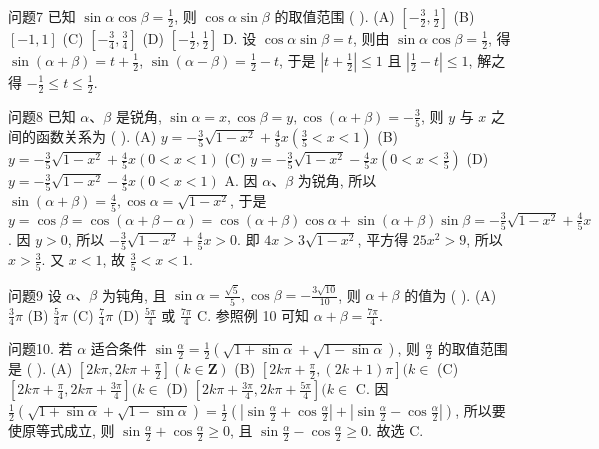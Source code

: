 问题7 已知 $\sin \alpha \cos \beta=\frac{1}{2}$, 则 $\cos \alpha \sin \beta$ 的取值范围 ( ).
(A) $\left[-\frac{3}{2}, \frac{1}{2}\right]$
(B) $[-1,1]$
(C) $\left[-\frac{3}{4}, \frac{3}{4}\right]$
(D) $\left[-\frac{1}{2}, \frac{1}{2}\right]$
D. 设 $\cos \alpha \sin \beta=t$, 则由 $\sin \alpha \cos \beta=\frac{1}{2}$, 得 $\sin (\alpha+\beta)=t+\frac{1}{2}$, $\sin (\alpha-\beta)=\frac{1}{2}-t$, 于是 $\left|t+\frac{1}{2}\right| \leqslant 1$ 且 $\left|\frac{1}{2}-t\right| \leqslant 1$, 解之得 $-\frac{1}{2} \leqslant t \leqslant \frac{1}{2}$.



问题8 已知 $\alpha 、 \beta$ 是锐角, $\sin \alpha=x, \cos \beta=y, \cos (\alpha+\beta)=-\frac{3}{5}$, 则 $y$ 与 $x$ 之间的函数关系为 ( ).
(A) $y=-\frac{3}{5} \sqrt{1-x^2}+\frac{4}{5} x\left(\frac{3}{5}<x<1\right)$
(B) $y=-\frac{3}{5} \sqrt{1-x^2}+\frac{4}{5} x(0<x<1)$
(C) $y=-\frac{3}{5} \sqrt{1-x^2}-\frac{4}{5} x\left(0<x<\frac{3}{5}\right)$
(D) $y=-\frac{3}{5} \sqrt{1-x^2}-\frac{4}{5} x(0<x<1)$
A. 因 $\alpha 、 \beta$ 为锐角, 所以 $\sin (\alpha+\beta)=\frac{4}{5}, \cos \alpha=\sqrt{1-x^2}$, 于是 $y= \cos \beta=\cos (\alpha+\beta-\alpha)=\cos (\alpha+\beta) \cos \alpha+\sin (\alpha+\beta) \sin \beta=-\frac{3}{5} \sqrt{1-x^2}+ \frac{4}{5} x$. 因 $y>0$, 所以 $-\frac{3}{5} \sqrt{1-x^2}+\frac{4}{5} x>0$. 即 $4 x>3 \sqrt{1-x^2}$, 平方得 $25 x^2>9$, 所以 $x>\frac{3}{5}$. 又 $x<1$, 故 $\frac{3}{5}<x<1$.



问题9 设 $\alpha 、 \beta$ 为钝角, 且 $\sin \alpha=\frac{\sqrt{5}}{5}, \cos \beta=-\frac{3 \sqrt{10}}{10}$, 则 $\alpha+\beta$ 的值为 ( ).
(A) $\frac{3}{4} \pi$
(B) $\frac{5}{4} \pi$
(C) $\frac{7}{4} \pi$
(D) $\frac{5 \pi}{4}$ 或 $\frac{7 \pi}{4}$
C. 参照例 10 可知 $\alpha+\beta=\frac{7 \pi}{4}$.



问题10. 若 $\alpha$ 适合条件 $\sin \frac{\alpha}{2}=\frac{1}{2}(\sqrt{1+\sin \alpha}+\sqrt{1-\sin \alpha})$, 则 $\frac{\alpha}{2}$ 的取值范围是 ( ).
(A) $\left[2 k \pi, 2 k \pi+\frac{\pi}{2}\right](k \in \mathbf{Z})$
(B) $\left[2 k \pi+\frac{\pi}{2},(2 k+1) \pi\right](k \in$
(C) $\left[2 k \pi+\frac{\pi}{4}, 2 k \pi+\frac{3 \pi}{4}\right](k \in$
(D) $\left[2 k \pi+\frac{3 \pi}{4}, 2 k \pi+\frac{5 \pi}{4}\right](k \in$
C. 因 $\frac{1}{2}(\sqrt{1+\sin \alpha}+\sqrt{1-\sin \alpha})=\frac{1}{2}\left(\left|\sin \frac{\alpha}{2}+\cos \frac{\alpha}{2}\right|+\right. \left.\left|\sin \frac{\alpha}{2}-\cos \frac{\alpha}{2}\right|\right)$, 所以要使原等式成立, 则 $\sin \frac{\alpha}{2}+\cos \frac{\alpha}{2} \geqslant 0$, 且 $\sin \frac{\alpha}{2}- \cos \frac{\alpha}{2} \geqslant 0$. 故选 C.



